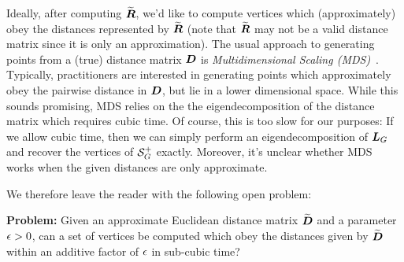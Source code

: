 Ideally, after computing  $\widetilde{\vb*{R}}$, we'd like to compute vertices which (approximately) obey the  distances represented by $\widetilde{\vb*{R}}$ (note  that $\widetilde{\vb*{R}}$ may not be a valid distance matrix since it  is only an approximation). The usual approach to generating points from a (true) distance matrix $\vb*{D}$ is \emph{Multidimensional Scaling (MDS)}~\cite{kruskal1978multidimensional}. Typically, practitioners are interested  in  generating points which approximately  obey the pairwise distance in  $\vb*{D}$, but  lie in a lower dimensional space. 
While  this sounds promising, MDS relies on the the eigendecomposition of the distance matrix which requires cubic time. Of  course, this is too slow for our  purposes:  If we allow cubic time, then we can simply perform an  eigendecomposition of $\vb*{L}_G$ and recover the vertices of $\mathcal{S}_G^+$ exactly. Moreover, it's unclear whether MDS works when  the given distances are  only approximate. 


We therefore  leave the reader with  the  following open problem:  

\textbf{Problem:} Given an approximate Euclidean distance matrix $\widetilde{\vb*{D}}$ and a parameter  $\epsilon>0$, can a set of vertices be computed which  obey  the distances given by $\widetilde{\vb*{D}}$ within an additive factor of $\epsilon$  in sub-cubic time? 










